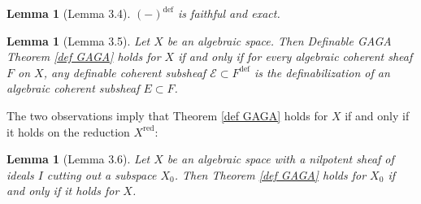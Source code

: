 \documentclass{amsart}
\newtheorem{lemma}[theorem]{Lemma}
\theoremstyle{definition}
\numberwithin{equation}{section}
\newcommand{\definable}{\mathrm{def}}
\begin{document}
\begin{lemma}[Lemma 3.4]
  $(-)^{\definable}$ is faithful and exact.
\end{lemma}

\begin{lemma}[Lemma 3.5]
  \label{Lemma 3.5}
  Let $X$ be an algebraic space.
  Then Definable GAGA Theorem \ref{def GAGA} holds for $X$ if and only if
  for every algebraic coherent sheaf $F$ on $X$,
  any definable coherent subsheaf $\mathcal{E} \subset F^{\definable}$ is the definabilization of
  an algebraic coherent subsheaf $E \subset F$.
\end{lemma}

The two observations imply that Theorem \ref{def GAGA} holds for $X$
if and only if it holds on the reduction $X^{\mathrm{red}}$:
\begin{lemma}[Lemma 3.6]
  \label{Lemma 3.6}
  Let $X$ be an algebraic space with a nilpotent sheaf of ideals $I$ cutting out a subspace $X_0$.
  Then Theorem \ref{def GAGA} holds for $X_0$ if and only if it holds for $X$.
\end{lemma}
\end{document}

